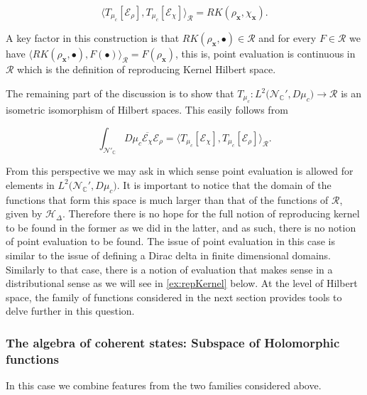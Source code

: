 \documentclass{elsarticle}%
\begin{document}
\begin{equation}
\label{eq:scalarProductCoherent}
\langle T_{\mu_c}[\mathcal{E}_{\rho}] , T_{\mu_c}[\mathcal{E}_{\chi}]\rangle_\mathcal{R}=RK(\rho_{\mathbf{x}},\chi_{\mathbf{x}}).
\end{equation}

A key factor in this construction is that $RK(\rho_{\mathbf{x}},\bullet )\in \mathcal{R}$ and for every $F\in \mathcal{R}$ we have  $\langle RK(\rho_{\mathbf{x}}, \bullet  ) , F(\bullet)\rangle_\mathcal{R}= F(\rho_{\mathbf{x}})$, this is, point evaluation is continuous in $\mathcal{R}$ which is the definition of reproducing Kernel Hilbert space.  

The remaining part of the discussion is to show that $T_{\mu_c}:L^2\big({\mathcal{N}_{\mathbb{C}}'},D\mu_c\big) \to \mathcal{R}$ is an isometric isomorphism of Hilbert spaces. This easily follows from 

\begin{equation}
\label{eq:ISometry}
\int_{\mathcal{N}'_\mathbb{C}}D\mu_c\overline{ \mathcal{E}_{\chi}} \mathcal{E}_{\rho}
=\langle T_{\mu_c}[\mathcal{E}_{\chi}] , T_{\mu_c}[\mathcal{E}_{\rho}]\rangle_\mathcal{R}.
\end{equation}


From this perspective we may ask in which sense point evaluation is allowed for elements in $L^2\big({\mathcal{N}_{\mathbb{C}}'},D\mu_c\big)$. It is important to notice that the domain of the functions that form this space is much larger than that of the functions of $\mathcal{R}$, given by $\mathcal{H}_\Delta$. Therefore there is no hope for the full notion of reproducing kernel  to be found in the former as we did in the latter, and as such, there is no notion of point evaluation to be found. The issue of point evaluation in this case is similar to the issue of defining a Dirac 
delta in finite dimensional domains. Similarly to that case, there is a notion of evaluation that makes sense in a distributional sense as we will see in \autoref{ex:repKernel} below.  At the level of Hilbert space, the family of functions considered in the next section provides tools to delve further in this question.


 
\subsubsection{The algebra of coherent states: Subspace of Holomorphic functions}

In this case we combine features from the two families considered above. 
\end{document}
